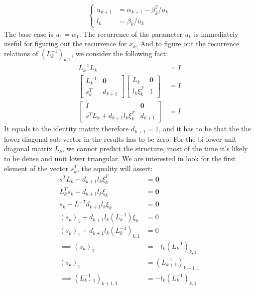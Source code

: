 \documentclass[]{article}
\theoremstyle{definition}
\begin{document}
            \begin{align}
                \begin{cases}
                    u_{k + 1} &= \alpha_{k + 1} - \beta_k^2/u_k
                    \\
                    l_k &= \beta_k/u_k
                \end{cases}
            \end{align}
            The base case is $u_1 = \alpha_1$. The recurrence of the parameter $u_k$ is immediately useful for figuring out the recurrence for $x_k$, And to figure out the recurrence relations of $(L^{-1}_k)_{k, 1}$, we consider the following fact: 
            \begin{align}
                L^{-1}_k L_k &= I 
                \\
                \begin{bmatrix}
                    L^{-1}_k & \mathbf{0} \\
                    s_k^T & d_{k + 1}
                \end{bmatrix}
                \begin{bmatrix}
                    L_k & \mathbf{0} \\
                    l_k \xi_k^T & 1
                \end{bmatrix} &= I
                \\
                \begin{bmatrix}
                    I & \mathbf{0} \\ 
                    s^TL_k + d_{k + 1}l_k \xi_k^T &d_{k + 1}
                \end{bmatrix} &= I
            \end{align}
            It equals to the identity matrix therefore $d_{k + 1} = 1$, and it has to be that the the lower diagonal sub vector in the results has to be zero. For the bi-lower unit diagonal matrix $L_k$, we cannot predict the structure, most of the time it's likely to be dense and unit lower  triangular. We are interested in look for the first element of the vector $s_k^T$, the equality will assert: 
            \begin{align}
                s^TL_k + d_{k + 1}l_k \xi_k^T &= \mathbf{0}
                \\
                L_k^{T}s_k + d_{k + 1}l_k \xi_k &= \mathbf{0}
                \\
                s_k + L^{-T} d_{k + 1}l_k \xi_k &= \mathbf{0}
                \\
                (s_k)_1 + d_{k + 1}l_k (L^{-1}_k)\xi_k &= 0
                \\
                (s_k)_1 + d_{k + 1}l_k(L^{-1}_k)_{k , 1} &= 0
                \\\implies
                (s_k)_1 &= - l_k(L^{-1}_k)_{k, 1} 
                \\
                (s_k)_1 &= (L^{-1}_{k + 1})_{k + 1, 1}
                \\
                \implies
                (L^{-1}_{k + 1})_{k + 1, 1} &=
                -l_k(L^{-1}_k)_{k, 1}
            \end{align}
\end{document}
